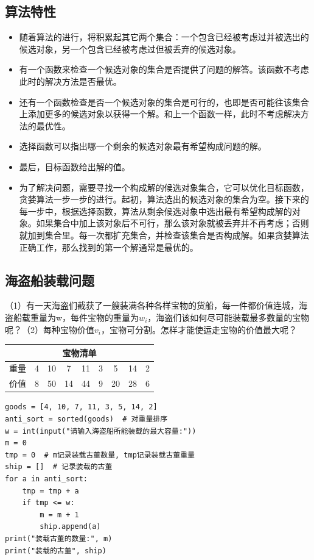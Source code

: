 \subsection{算法特性}

\begin{itemize}
    \item 随着算法的进行，将积累起其它两个集合：一个包含已经被考虑过并被选出的候选对象，另一个包含已经被考虑过但被丢弃的候选对象。
    \item 有一个函数来检查一个候选对象的集合是否提供了问题的解答。该函数不考虑此时的解决方法是否最优。
    \item 还有一个函数检查是否一个候选对象的集合是可行的，也即是否可能往该集合上添加更多的候选对象以获得一个解。和上一个函数一样，此时不考虑解决方法的最优性。
    \item 选择函数可以指出哪一个剩余的候选对象最有希望构成问题的解。
    \item 最后，目标函数给出解的值。
    \item 为了解决问题，需要寻找一个构成解的候选对象集合，它可以优化目标函数，贪婪算法一步一步的进行。起初，算法选出的候选对象的集合为空。接下来的每一步中，根据选择函数，算法从剩余候选对象中选出最有希望构成解的对象。如果集合中加上该对象后不可行，那么该对象就被丢弃并不再考虑；否则就加到集合里。每一次都扩充集合，并检查该集合是否构成解。如果贪婪算法正确工作，那么找到的第一个解通常是最优的。
\end{itemize}

\subsection{海盗船装载问题}

（1）有一天海盗们截获了一艘装满各种各样宝物的货船，每一件都价值连城，海盗船载重量为w，每件宝物的重量为$w_i$，海盗们该如何尽可能装载最多数量的宝物呢？（2）每种宝物价值$v_i$，宝物可分割。怎样才能使运走宝物的价值最大呢？

\begin{table}[htpb]
    \centering
    \begin{tabular}{@{}ccccccccc@{}}
    \toprule
    \multicolumn{9}{c}{宝物清单}                \\ \midrule
    重量 & 4 & 10 & 7  & 11 & 3 & 5  & 14 & 2 \\
    价值 & 8 & 50 & 14 & 44 & 9 & 20 & 28 & 6 \\ \bottomrule
    \end{tabular}
\end{table}

\begin{lstlisting}
goods = [4, 10, 7, 11, 3, 5, 14, 2]
anti_sort = sorted(goods)  # 对重量排序
w = int(input("请输入海盗船所能装载的最大容量:"))
m = 0
tmp = 0  # m记录装载古董数量, tmp记录装载古董重量
ship = []  # 记录装载的古董
for a in anti_sort:
    tmp = tmp + a
    if tmp <= w:
        m = m + 1
        ship.append(a)    
print("装载古董的数量:", m)
print("装载的古董", ship)
\end{lstlisting}

